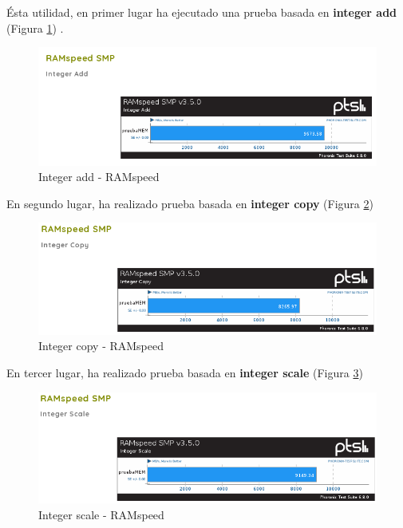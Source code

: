 Ésta utilidad, en primer lugar ha ejecutado una prueba basada en \textbf{integer add} (Figura \ref{fig:figura1-1-1}) .

\begin{figure}[H] %
	\centering
	\includegraphics[scale=0.8]{figuras/ejercicio1/resultados/figura1-1-1.png} 
	\caption{Integer add - RAMspeed} 
	\label{fig:figura1-1-1}
\end{figure}

En segundo lugar, ha realizado prueba basada en \textbf{integer copy} (Figura \ref{fig:figura1-1-2})

\begin{figure}[H] %
	\centering
	\includegraphics[scale=0.8]{figuras/ejercicio1/resultados/figura1-1-2.png} 
	\caption{Integer copy - RAMspeed} 
	\label{fig:figura1-1-2}
\end{figure}

En tercer lugar, ha realizado prueba basada en \textbf{integer scale} (Figura \ref{fig:figura1-1-3})

\begin{figure}[H] %
	\centering
	\includegraphics[scale=0.8]{figuras/ejercicio1/resultados/figura1-1-3.png} 
	\caption{Integer scale - RAMspeed} 
	\label{fig:figura1-1-3}
\end{figure}

